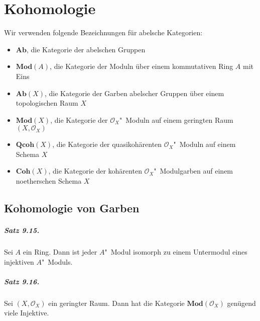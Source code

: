 \chapter{Kohomologie}

Wir verwenden folgende Bezeichnungen für abelsche Kategorien:
\begin{itemize}
\item $\mathbf{Ab}$, die Kategorie der abelschen Gruppen
\item $\mathbf{Mod}(A)$, die Kategorie der Moduln über einem kommutativen Ring $A$ mit Eins
\item $\mathbf{Ab}(X)$, die Kategorie der Garben abelscher Gruppen über einem topologischen Raum $X$
\item $\mathbf{Mod}(X)$, die Kategorie der $\mathcal{O}_X$"~Moduln auf einem geringten Raum $(X,\mathcal{O}_X)$
\item $\mathbf{Qcoh}(X)$, die Kategorie der quasikohärenten $\mathcal{O}_X$"~Moduln auf einem Schema $X$
\item $\mathbf{Coh}(X)$, die Kategorie der kohärenten $\mathcal{O}_X$"~Modulgarben auf einem noetherschen Schema $X$
\end{itemize}

\section{Kohomologie von Garben}

\paragraph{Satz 9.15.}\label{9.15} Sei $A$ ein Ring. Dann ist jeder $A$"~Modul isomorph zu einem Untermodul eines injektiven $A$"~Moduls.

\paragraph{Satz 9.16.}\label{9.16} Sei $(X,\mathcal{O}_X)$ ein geringter Raum. Dann hat die Kategorie $\mathbf{Mod}(\mathcal{O}_X)$ genügend viele Injektive.

